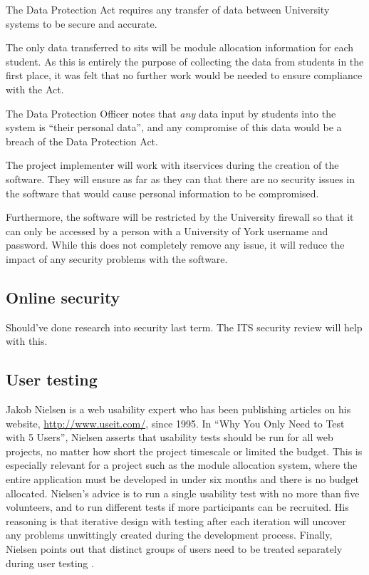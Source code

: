 \documentclass[]{scrartcl}
\begin{document}

The Data Protection Act requires any transfer of data between University
systems to be secure and accurate.

The only data transferred to \gls{sits} will be module allocation information
for each student. As this is entirely the purpose of collecting the data from
students in the first place, it was felt that no further work would be needed
to ensure compliance with the Act.


The Data Protection Officer notes that \emph{any} data input by students into the
system is ``their personal data'', and any compromise of this data would be a
breach of the Data Protection Act.

The project implementer will work with \gls{itservices} during the creation of
the software. They will ensure as far as they can that there are no security
issues in the software that would cause personal information to be compromised.

Furthermore, the software will be restricted by the University firewall so
that it can only be accessed by a person with a University of York username
and password. While this does not completely remove any issue, it will reduce
the impact of any security problems with the software.

\subsection{Online security}

Should've done research into security last term. The ITS security review will
help with this.


\subsection{User testing}

Jakob Nielsen is a web usability expert who has been publishing articles on
his website, \url{http://www.useit.com/}, since 1995. In ``Why You Only Need to
Test with 5 Users'', Nielsen asserts that usability tests should be run for all
web projects, no matter how short the project timescale or limited the budget.
This is especially relevant for a project such as the module allocation
system, where the entire application must be developed in under six months and
there is no budget allocated. Nielsen's advice is to run a single usability
test with no more than five volunteers, and to run different tests if more
participants can be recruited. His reasoning is that iterative design with
testing after each iteration will uncover any problems unwittingly created
during the development process. Finally, Nielsen points out that distinct
groups of users need to be treated separately during user testing
\cite{nielsen2000fiveusers}.
\end{document}
